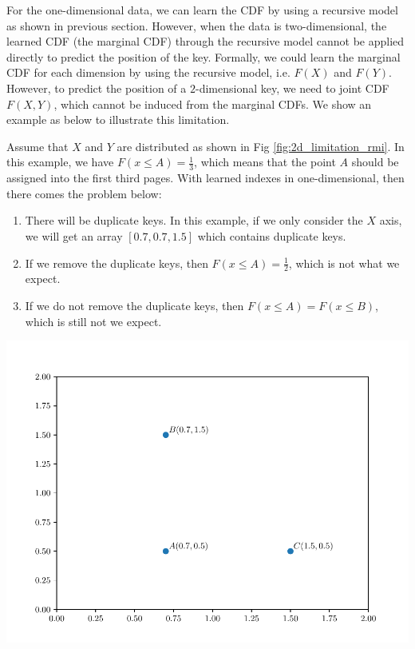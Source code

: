 For the one-dimensional data, we can learn the CDF by using a recursive model as shown in previous section. However, when the data is two-dimensional, the learned CDF (the marginal CDF) through the recursive model cannot be applied directly to predict the position of the key. Formally, we could learn the marginal CDF for each dimension by using the recursive model, i.e. $F(X)$ and $F(Y)$. However, to predict the position of a $2$-dimensional key, we need to joint CDF $F(X,Y)$, which cannot be induced from the marginal CDFs. We show an example as below to illustrate this limitation.

\begin{mscexample}
	Assume that $X$ and $Y$ are distributed as shown in Fig \ref{fig:2d_limitation_rmi}. In this example, we have $F(x\leq A)=\frac{1}{3}$, which means that the point $A$ should be assigned into the first third pages. With learned indexes in one-dimensional, then there comes the problem below:
	
	\begin{enumerate}
		\item There will be duplicate keys. In this example, if we only consider the $X$ axis, we will get an array $[0.7, 0.7, 1.5]$ which contains duplicate keys. 
		\item If we remove the duplicate keys, then $F(x\leq A)=\frac{1}{2}$, which is not what we expect.
		\item If we do not remove the duplicate keys, then $F(x\leq A)=F(x\leq B)$, which is still not we expect.
	\end{enumerate}
	

		\centering
		\includegraphics[scale=0.5]{graphs/implementation/2d/2d_rmi_limitation}
		\label{fig:2d_limitation_rmi}

	
\end{mscexample}

